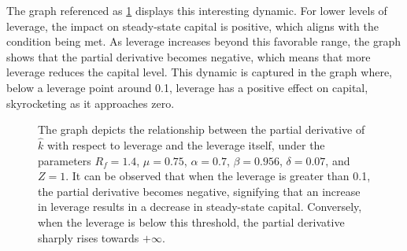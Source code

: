\documentclass[12pt]{report}
\begin{document}
The graph referenced as \ref{plot_part} displays this interesting dynamic. For lower levels of leverage, the impact on
steady-state capital is positive, which aligns with the condition being met. As leverage increases beyond this favorable
range, the graph shows that the partial derivative becomes negative, which means that more leverage reduces the capital
level. This dynamic is captured in the graph where, below a leverage point around 0.1, leverage has a positive effect on
capital, skyrocketing as it approaches zero. 
\begin{figure}
    \centering
    \caption{The graph depicts the relationship between the partial derivative of \(\hat{k}\) with respect to
        leverage and the leverage itself, under the parameters \(R_f=1.4\), \(\mu=0.75\), \(\alpha= 0.7\),
        \(\beta=0.956\), \(\delta =0.07\), and \(Z=1\). It can be observed that when the leverage is greater than 0.1,
        the partial derivative becomes negative, signifying that an increase in leverage results in a decrease in
        steady-state capital. Conversely, when the leverage is below this threshold, the partial derivative sharply
        rises towards \(+\infty\). }
    \label{plot_part}
\end{figure}
\end{document}
